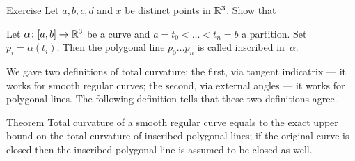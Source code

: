 \begin{thm}{Exercise}
Let $a,b,c,d$ and $x$ be distinct points in $\mathbb{R}^3$.
Show that 
\end{thm}


Let  $\alpha\colon[a,b]\to \mathbb{R}^3$ be a curve and  $a=t_0<\dots<t_n=b$ a partition.
Set $p_i=\alpha(t_i)$.
Then the polygonal line $p_0\dots p_n$ is called inscribed in~$\alpha$.

We gave two definitions of total curvature:
the first, via tangent indicatrix --- it works for smooth regular curves;
the second, via external angles --- it works for polygonal lines.
The following definition tells that these two definitions agree.

\begin{thm}{Theorem}
Total curvature of a smooth regular curve equals to the exact upper bound on the total curvature of inscribed polygonal lines; if the original curve is closed then the inscribed polygonal line is assumed to be closed as well. 
\end{thm}
